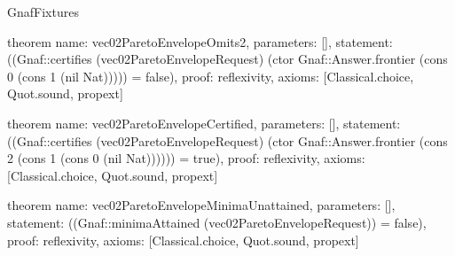 \begin{lexlean}{GnafFixtures}
\begin{semanticmodule}
theorem{
  name: vec02ParetoEnvelopeOmits2,
  parameters: [],
  statement: ((Gnaf::certifies (vec02ParetoEnvelopeRequest) (ctor Gnaf::Answer.frontier (cons 0 (cons 1 (nil Nat))))) = false),
  proof: reflexivity{},
  axioms: [Classical.choice, Quot.sound, propext]
}

theorem{
  name: vec02ParetoEnvelopeCertified,
  parameters: [],
  statement: ((Gnaf::certifies (vec02ParetoEnvelopeRequest) (ctor Gnaf::Answer.frontier (cons 2 (cons 1 (cons 0 (nil Nat)))))) = true),
  proof: reflexivity{},
  axioms: [Classical.choice, Quot.sound, propext]
}

theorem{
  name: vec02ParetoEnvelopeMinimaUnattained,
  parameters: [],
  statement: ((Gnaf::minimaAttained (vec02ParetoEnvelopeRequest)) = false),
  proof: reflexivity{},
  axioms: [Classical.choice, Quot.sound, propext]
}


\end{semanticmodule}
\end{lexlean}

